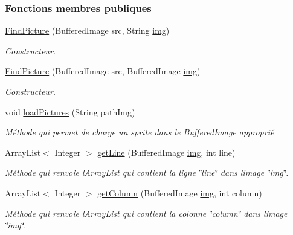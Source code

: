 \subsubsection*{Fonctions membres publiques}
\begin{DoxyCompactItemize}
\item 
\hyperlink{classPictures_1_1FindPicture_a913868e0545034f6dca13d4b5b601d39}{Find\+Picture} (Buffered\+Image src, String \hyperlink{classPictures_1_1FindPicture_aae63a27df999ed48e5af4c680c3d75ad}{img})
\begin{DoxyCompactList}\small\item\em Constructeur. \end{DoxyCompactList}\item 
\hyperlink{classPictures_1_1FindPicture_a86b1b0b63cac91983b0ce92a17eefaba}{Find\+Picture} (Buffered\+Image src, Buffered\+Image \hyperlink{classPictures_1_1FindPicture_aae63a27df999ed48e5af4c680c3d75ad}{img})
\begin{DoxyCompactList}\small\item\em Constructeur. \end{DoxyCompactList}\item 
void \hyperlink{classPictures_1_1FindPicture_af0b1bc80dfd98aea65b056235702c3b4}{load\+Pictures} (String path\+Img)
\begin{DoxyCompactList}\small\item\em Méthode qui permet de charge un sprite dans le Buffered\+Image approprié \end{DoxyCompactList}\item 
Array\+List$<$ Integer $>$ \hyperlink{classPictures_1_1FindPicture_af6dbfb9eebba6ecaefb4c8c196cc3ccb}{get\+Line} (Buffered\+Image \hyperlink{classPictures_1_1FindPicture_aae63a27df999ed48e5af4c680c3d75ad}{img}, int line)
\begin{DoxyCompactList}\small\item\em Méthode qui renvoie l\textquotesingle{}Array\+List qui contient la ligne \char`\"{}line\char`\"{} dans l\textquotesingle{}image \char`\"{}img\char`\"{}. \end{DoxyCompactList}\item 
Array\+List$<$ Integer $>$ \hyperlink{classPictures_1_1FindPicture_a604c9cb11133f9910028abda35352255}{get\+Column} (Buffered\+Image \hyperlink{classPictures_1_1FindPicture_aae63a27df999ed48e5af4c680c3d75ad}{img}, int column)
\begin{DoxyCompactList}\small\item\em Méthode qui renvoie l\textquotesingle{}Array\+List qui contient la colonne \char`\"{}column\char`\"{} dans l\textquotesingle{}image \char`\"{}img\char`\"{}. \end{DoxyCompactList}\item 

\end{DoxyCompactItemize}
